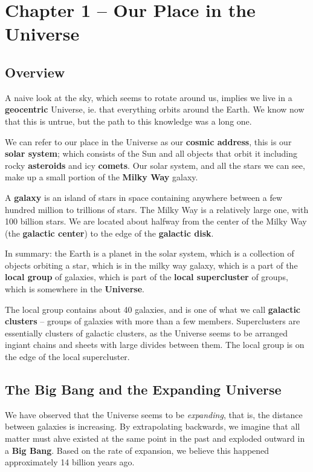 \section{Chapter 1 -- Our Place in the Universe}
\subsection{Overview}
A naive look at the sky, which seems to rotate around us, implies we live in a {\bf geocentric} Universe, ie. that everything orbits around the Earth. We know now that this is untrue, but the path to this knowledge was a long one.

We can refer to our place in the Universe as our {\bf cosmic address}, this is our {\bf solar system}; which consists of the Sun and all objects that orbit it including rocky {\bf asteroids} and icy {\bf comets}. Our solar system, and all the stars we can see, make up a small portion of the {\bf Milky Way} galaxy.

A {\bf galaxy} is an island of stars in space containing anywhere between a few hundred million to trillions of stars. The Milky Way is a relatively large one, with 100 billion stars. We are located about halfway from the center of the Milky Way (the {\bf galactic center}) to the edge of the {\bf galactic disk}.

In summary: the Earth is a planet in the solar system, which is a collection of objects orbiting a star, which is in the milky way galaxy, which is a part of the {\bf local group} of galaxies, which is part of the {\bf local supercluster} of groups, which is somewhere in the {\bf Universe}.

The local group contains about 40 galaxies, and is one of what we call {\bf galactic clusters} -- groups of galaxies with more than a few members. Superclusters are essentially clusters of galactic clusters, as the Universe seems to be arranged ingiant chains and sheets with large divides between them. The local group is on the edge of the local supercluster.

\subsection{The Big Bang and the Expanding Universe}
We have observed that the Universe seems to be \emph{expanding}, that is, the distance between galaxies is increasing. By extrapolating backwards, we imagine that all matter must ahve existed at the same point in the past and exploded outward in a {\bf Big Bang}. Based on the rate of expansion, we believe this happened approximately 14 billion years ago.

